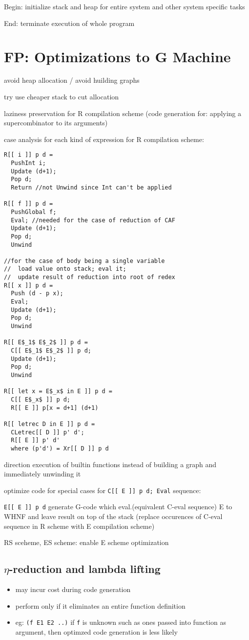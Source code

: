 \documentclass[8pt]{extarticle}
\begin{document}
\begin{multicols*}{2}
Begin: initialize stack and heap for entire system and other system specific tasks

End: terminate execution of whole program

\vfill\null
\columnbreak

\section{FP: Optimizations to G Machine}

avoid heap allocation / avoid huilding graphs

try use cheaper stack to cut allocation

laziness preservation for R compilation scheme (code generation for: applying a supercombinator to its arguments)

case analysis for each kind of expression for R compilation scheme:
\begin{lstlisting}
R[[ i ]] p d =
  PushInt i;
  Update (d+1);
  Pop d;
  Return //not Unwind since Int can't be applied

R[[ f ]] p d =
  PushGlobal f;
  Eval; //needed for the case of reduction of CAF
  Update (d+1);
  Pop d;
  Unwind

//for the case of body being a single variable
//  load value onto stack; eval it;
//  update result of reduction into root of redex
R[[ x ]] p d =
  Push (d - p x);
  Eval;
  Update (d+1);
  Pop d;
  Unwind

R[[ E$_1$ E$_2$ ]] p d =
  C[[ E$_1$ E$_2$ ]] p d;
  Update (d+1);
  Pop d;
  Unwind

R[[ let x = E$_x$ in E ]] p d =
  C[[ E$_x$ ]] p d;
  R[[ E ]] p[x = d+1] (d+1)

R[[ letrec D in E ]] p d =
  CLetrec[[ D ]] p' d';
  R[[ E ]] p' d'
  where (p'd') = Xr[[ D ]] p d
\end{lstlisting}

direction execution of builtin functions instead of building a graph and immediately unwinding it

optimize code for special cases for \verb|C[[ E ]] p d; Eval| sequence:

\verb|E[[ E ]] p d| generate G-code which eval.(equivalent C-eval sequence) E to WHNF and leave result on top of the stack (replace occurences of C-eval sequence in R scheme with E compilation scheme)

RS sceheme, ES scheme: enable E scheme optimization

\subsection{$\eta$-reduction and lambda lifting}
\begin{itemize}
\item may incur cost during code generation
\item perform only if it eliminates an entire function definition
\item eg: \verb|(f E1 E2 ..)| if \verb|f| is unknown such as ones passed into function as argument, then optimzed code generation is less likely
\end{itemize}


\end{multicols*}
\end{document}
